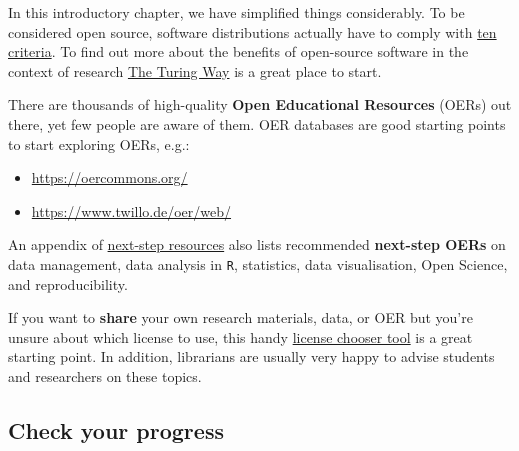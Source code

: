 \documentclass[
  letterpaper,
  DIV=11,
  numbers=noendperiod]{scrreprt}
\providecommand{\tightlist}{%
  \setlength{\itemsep}{0pt}\setlength{\parskip}{0pt}}
\begin{document}
\begin{tcolorbox}[enhanced jigsaw, arc=.35mm, bottomrule=.15mm, bottomtitle=1mm, breakable, colback=white, colbacktitle=quarto-callout-note-color!10!white, colframe=quarto-callout-note-color-frame, coltitle=black, left=2mm, leftrule=.75mm, opacityback=0, opacitybacktitle=0.6, rightrule=.15mm, title=\textcolor{quarto-callout-note-color}{\faInfo}\hspace{0.5em}{Going further \emoji{rocket}}, titlerule=0mm, toprule=.15mm, toptitle=1mm]

In this introductory chapter, we have simplified things considerably. To
be considered open source, software distributions actually have to
comply with \href{https://opensource.org/osd}{ten criteria}. To find out
more about the benefits of open-source software in the context of
research
\href{https://book.the-turing-way.org/reproducible-research/open/open-source}{The
Turing Way} is a great place to start.

There are thousands of high-quality \textbf{Open Educational Resources}
(OERs) out there, yet few people are aware of them. OER databases are
good starting points to start exploring OERs, e.g.:

\begin{itemize}
\tightlist
\item
  \url{https://oercommons.org/}
\item
  \url{https://www.twillo.de/oer/web/}
\end{itemize}

An appendix of
\href{https://elenlefoll.github.io/RstatsTextbook/A_FurtherResources.html}{next-step
resources} also lists recommended \textbf{next-step OERs} on data
management, data analysis in \texttt{R}, statistics, data visualisation,
Open Science, and reproducibility.

If you want to \textbf{share} your own research materials, data, or OER
but you're unsure about which license to use, this handy
\href{https://chooser-beta.creativecommons.org/}{license chooser tool}
is a great starting point. In addition, librarians are usually very
happy to advise students and researchers on these topics.

\end{tcolorbox}

\subsection*{Check your progress}\label{check-your-progress-1}
\end{document}
